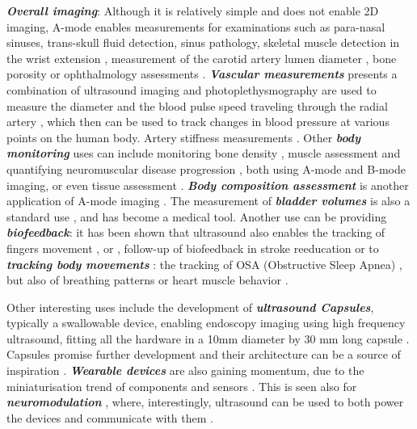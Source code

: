 \documentclass{article}
\begin{document}
\textbf{\textit{Overall imaging}}: Although it is relatively simple and does not enable 2D imaging, A-mode enables 
measurements for examinations such as para-nasal sinuses, trans-skull fluid detection, sinus pathology, skeletal muscle detection in the wrist extension \cite{noauthor_wrist_nodate}, measurement of the carotid artery lumen diameter \cite{li_new_2014,hu_design_2011,zhang_multi-channel_2017,shomaji_early_2019}, bone porosity \cite{wahab_design_2016,fontes-pereira_monitoring_2018,grasel_characterization_2017} or ophthalmology assessments \cite{carotenuto_very_2004}. \textbf{\textit{Vascular measurements}} presents a combination of ultrasound imaging and photoplethysmography are used to measure the diameter and the blood pulse speed traveling through the radial artery \cite{worthing_using_2016}, which then can be used to track changes in blood pressure at various points on the human body. Artery stiffness measurements \cite{joseph_technical_2015,joseph_artsenstouch_2015,seo_non-invasive_2018}. Other \textbf{\textit{body monitoring}} uses can include monitoring bone density \cite{wahab_design_2016,fontes-pereira_monitoring_2018}, muscle assessment \cite{brausch_towards_2019} and quantifying neuromuscular disease progression \cite{zhang_design_2015}, both using A-mode and B-mode imaging, or even tissue assessment \cite{keyes_electrical_2017}. \textbf{\textit{Body composition assessment}} is another application of A-mode imaging \cite{wagner_validity_2016,martins_-scan_2017}. The measurement of \textbf{\textit{bladder volumes}} is also a standard use \cite{kuru_feasibility_2019}, and has become a medical tool. Another use can be providing \textbf{\textit{biofeedback}}: it has been shown that ultrasound also enables the tracking of fingers movement \cite{sikdar_novel_2014}, or , follow-up of biofeedback in stroke reeducation \cite{sosnowska_training_2019} or to \textbf{\textit{tracking body movements}} : the tracking of OSA (Obstructive Sleep Apnea) \cite{weng_fpga-based_2015}, but also of breathing patterns \cite{shahshahani_ultrasound_2018} or heart muscle behavior \cite{nguyen_estimating_2019}.

Other interesting uses include the development of \textbf{\textit{ultrasound Capsules}}, typically a swallowable device, enabling endoscopy imaging using high frequency ultrasound, fitting all the hardware in a 10mm diameter by 30 mm long capsule \cite{cox_ultrasound_2017,wang_development_2017}. Capsules promise further development and their architecture can be a source of inspiration \cite{lee_towards_2014,memon_capsule_2016,lay_progress_2016,lay_-vivo_2018}. \textbf{\textit{ Wearable devices}} are also gaining momentum, due to the miniaturisation trend of components and sensors \cite{basak_wearable_2013}. This is seen also for \textbf{\textit{neuromodulation}} \cite{pashaei_flexible_2020}, where, interestingly, ultrasound can be used to both power the devices and communicate with them \cite{johnson_stimdust_2018,seo_wireless_2016,santagati_design_2020}.
\end{document}

